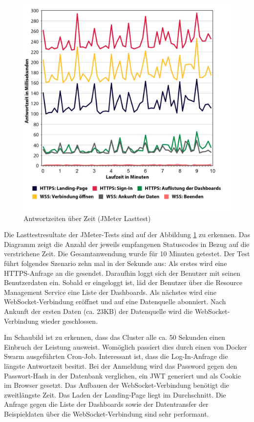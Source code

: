 \begin{figure}
    \begin{center}
    \includegraphics[scale=0.125]{img/abbildungen/Antwortzeitdiagramm}
    \end{center}
    \caption{Antwortzeiten über Zeit (JMeter Lasttest)}
    \label{figure:antwortzeitenueberzeit}
\end{figure}

Die Lasttestresultate der JMeter-Tests sind auf der Abbildung \ref{figure:antwortzeitenueberzeit}
zu erkennen. Das Diagramm zeigt die Anzahl der jeweils empfangenen Statuscodes in Bezug
auf die verstrichene Zeit. Die Gesamtanwendung wurde für 10 Minuten getestet.
Der Test führt folgendes Szenario zehn mal in der Sekunde aus:
Als erstes wird eine HTTPS-Anfrage an die  gesendet.
Daraufhin loggt sich der Benutzer mit seinen Benutzerdaten ein.
Sobald er eingeloggt ist, läd der Benutzer über die Resource Management Service
eine Liste der Dashboards. Als nächstes wird eine WebSocket-Verbindung eröffnet
und auf eine Datenquelle abonniert. Nach Ankunft der ersten Daten (ca. 23KB) der
Datenquelle wird die WebSocket-Verbindung wieder geschlossen.

Im Schaubild ist zu erkennen, dass das Cluster alle ca. 50 Sekunden einen Einbruch
der Leistung ausweist. Womöglich passiert dies durch einen von Docker Swarm ausgeführten
Cron-Job. Interessant ist, dass die Log-In-Anfrage die längste Antwortzeit besitzt.
Bei der Anmeldung wird das Password gegen den Passwort-Hash in der Datenbank verglichen,
ein JWT generiert und als Cookie im Browser gesetzt. Das Aufbauen der WebSocket-Verbindung
benötigt die zweitlängste Zeit. Das Laden der Landing-Page liegt im Durchschnitt. Die Anfrage gegen
die Liste der Dashboards sowie der Datentransfer der Beispieldaten über die WebSocket-Verbindung
sind sehr performant.

